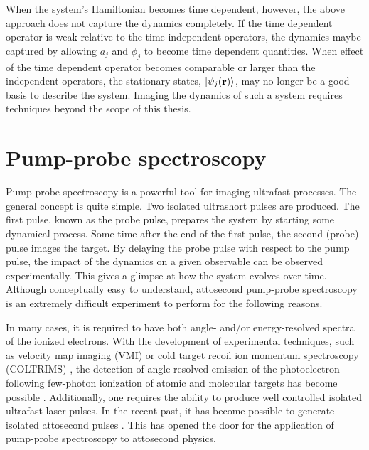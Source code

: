 When the system's Hamiltonian becomes time dependent, however, the above approach does not capture the dynamics completely. If the time dependent operator is weak relative to the time independent operators, the dynamics maybe captured by allowing $a_j$ and $\phi_j$ to become time dependent quantities. When effect of the time dependent operator becomes comparable or larger than the independent operators, the stationary states, $\ket{\psi_j(\mathbf{r})}$, may no longer be a good basis to describe the system. Imaging the dynamics of such a system requires techniques beyond the scope of this thesis.

\section{Pump-probe spectroscopy} %
\label{sec:pump_probe_spectroscopy}
Pump-probe spectroscopy is a powerful tool for imaging ultrafast processes. The general concept is quite simple. Two isolated ultrashort pulses are produced. The first pulse, known as the probe pulse, prepares the system by starting some dynamical process. Some time after the end of the first pulse, the second (probe) pulse images the target. By delaying the probe pulse with respect to the pump pulse, the impact of the dynamics on a given observable can be observed experimentally. This gives a glimpse at how the system evolves over time. Although conceptually easy to understand, attosecond pump-probe spectroscopy is an extremely difficult experiment to perform for the following reasons. 

In many cases, it is required to have both angle- and/or energy-resolved spectra of the ionized electrons. With the development of experimental techniques, such as velocity map imaging (VMI) \cite{kornilov2010,rouzee2011} or cold target recoil ion momentum spectroscopy (COLTRIMS) \cite{ullrich2003}, the detection of angle-resolved emission of the photoelectron following few-photon ionization of atomic and molecular targets has become possible \cite{ma2013}. 
Additionally, one requires the ability to produce well controlled isolated ultrafast laser pulses. In the recent past, it has become possible to generate isolated attosecond pulses \cite{frank2010}. This has opened the door for the application of pump-probe spectroscopy to attosecond physics. 

